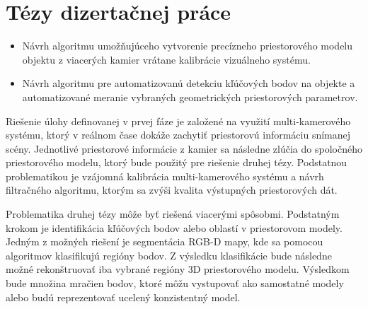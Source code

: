 \chapter{Tézy dizertačnej práce}
\label{kap:kalibracia}
\pagestyle{fancy}
\fancyhf{}
\fancyfoot[CE,CO]{\thepage}
\renewcommand{\footrulewidth}{1pt}



\begin{itemize}
	\item Návrh algoritmu umožňujúceho vytvorenie precízneho priestorového modelu objektu z viacerých kamier vrátane kalibrácie vizuálneho systému.
	\item Návrh algoritmu pre automatizovanú detekciu kľúčových bodov na objekte a automatizované meranie vybraných geometrických priestorových parametrov.
\end{itemize}



Riešenie úlohy definovanej v prvej fáze je založené na využití multi-kamerového systému, ktorý v reálnom čase dokáže zachytiť priestorovú informáciu snímanej scény. Jednotlivé priestorové informácie z kamier sa následne zlúčia do spoločného priestorového modelu, ktorý bude použitý pre riešenie druhej tézy.
Podstatnou problematikou je vzájomná kalibrácia multi-kamerového systému a návrh filtračného algoritmu, ktorým sa zvýši kvalita výstupných priestorových dát. 

Problematika druhej tézy môže byť riešená viacerými spôsobmi. Podstatným krokom je identifikácia kľúčových bodov alebo oblastí v priestorovom modely. Jedným z možných riešení je segmentácia RGB-D mapy, kde sa pomocou algoritmov klasifikujú regióny bodov. Z výsledku klasifikácie bude následne možné rekonštruovať iba vybrané regióny 3D priestorového modelu. Výsledkom bude množina mračien bodov, ktoré môžu vystupovať ako samostatné modely alebo budú reprezentovať ucelený konzistentný model.



